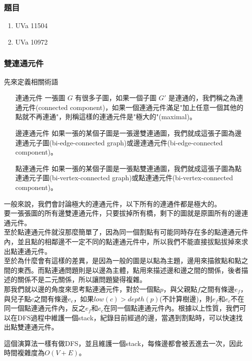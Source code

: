 \subsubsection{題目}
\begin{enumerate}
\item UVa 11504
\item UVa 10972
\end{enumerate}
\subsubsection{雙連通元件}
先來定義相關術語
\begin{enumerate}
\item [連通元件] 一張圖 $G$ 有很多子圖，如果一個子圖 $G'$ 是連通的，我們稱之為連通元件(connected component)，如果一個連通元件滿足"加上任意一個其他的點就不再連通"，則稱這樣的連通元件是"極大的"(maximal)。
\item [邊連通元件] 如果一張的某個子圖是一張邊雙連通圖，我們就成這張子圖為邊連通元子圖(bi-edge-connected graph)或邊連通元件(bi-edge-connected component)。
\item [點連通元件] 如果一張的某個子圖是一張點雙連通圖，我們就成這張子圖為點連通元子圖(bi-vertex-connected graph)或點連通元件(bi-vertex-connected component)。
\end{enumerate}
一般來說，我們會討論極大的連通元件，以下所有的連通件都是極大的。\\
要一張張圖的所有邊雙連通元件，只要拔掉所有橋，剩下的圖就是原圖所有的邊連通元件。\\
至於點連通元件就沒那麼簡單了，因為同一個割點有可能同時存在多的點連通元件內，並且點的相鄰邊不一定不同的點連通元件中，所以我們不能直接拔點拔掉來求出點連通元件。\\
至於為什麼會有這樣的差異，是因為一般的圖是以點為主題，邊用來描敘點和點之間的東西。而點連通問題則是以邊為主體，點用來描述邊和邊之間的關係，後者描述的關係不是二元關係，所以讓問題變得複雜。\\
那我們就以邊的角度來思考點連通元件，對於一個點$p$，與父親點$f$之間有條邊$e_f$，與兒子點$c$之間有條邊$e_c$，如果$low(c)>depth(p)$(不計算樹邊)，則$e_f$和$e_c$不在同一個點連通元件內，反之$e_f$和$e_c$在同一個點連通元件內。根據以上性質，我們可以在DFS過程中維護一個stack，紀錄目前經過的邊，當遇到割點時，可以快速找出點雙連通元件。

這個演算法一樣有做DFS，並且維護一個stack，每條邊都會被丟進去一次，因此時間複雜度為$O(V+E)$。